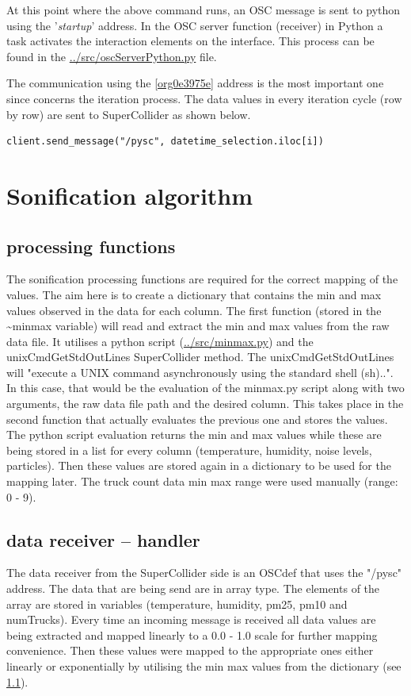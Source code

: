 \documentclass[11pt]{article}
\begin{document}
At this point where the above command runs, an OSC message is sent to python using the '\emph{startup}' address.  In the OSC server function (receiver) in Python a task activates the interaction elements on the interface.  This process can be found in the \url{../src/oscServerPython.py} file.

The communication using the \ref{org0e3975e} address is the most important one since concerns the iteration process.  The data values in every iteration cycle (row by row) are sent to SuperCollider as shown below.

\begin{verbatim}
client.send_message("/pysc", datetime_selection.iloc[i])
\end{verbatim}
\section{Sonification algorithm}
\label{sec:orgb88ab26}
\subsection{processing functions}
\label{sec:orgdfc8dc3}
The sonification processing functions are required for the correct mapping of the values.  The aim here is to create a dictionary that contains the min and max values observed in the data for each column.  The first function (stored in the \textasciitilde{}minmax variable) will read and extract the min and max values from the raw data file.  It utilises a python script (\url{../src/minmax.py}) and the unixCmdGetStdOutLines SuperCollider method.  The unixCmdGetStdOutLines will "execute a UNIX command asynchronously using the standard shell (sh)..".  In this case, that would be the evaluation of the minmax.py script along with two arguments, the raw data file path and the desired column.  This takes place in the second function that actually evaluates the previous one and stores the values.  The python script evaluation returns the min and max values while these are being stored in a list for every column (temperature, humidity, noise levels, particles).  Then these values are stored again in a dictionary to be used for the mapping later.  The truck count data min max range were used manually (range: 0 - 9).
\subsection{data receiver -- handler}
\label{sec:orgd8e7d9f}
The data receiver from the SuperCollider side is an OSCdef that uses the "/pysc" address.  The data that are being send are in array type.  The elements of the array are stored in variables (temperature, humidity, pm25, pm10 and numTrucks).  Every time an incoming message is received all data values are being extracted and mapped linearly to a 0.0 - 1.0 scale for further mapping convenience.  Then these values were mapped to the appropriate ones either linearly or exponentially by utilising the min max values from the dictionary (see \ref{sec:orgdfc8dc3}).
\end{document}
